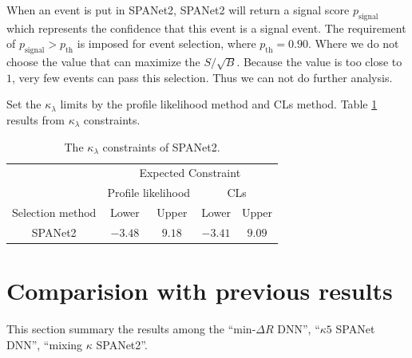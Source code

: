 \documentclass[12pt]{article}
\begin{document}
		When an event is put in SPANet2, SPANet2 will return a signal score $p_\text{signal}$ which represents the confidence that this event is a signal event. The requirement of $p_\text{signal} > p_\text{th}$ is imposed for event selection, where $p_\text{th} = 0.90$. Where we do not choose the value that can maximize the $S / \sqrt{B}$. Because the value is too close to $1$, very few events can pass this selection. Thus we can not do further analysis.  

		Set the $\kappa_\lambda$ limits by the profile likelihood method and CLs method. Table \ref{tab:kappa_constraint_SPANet} results from $\kappa_\lambda$ constraints.
		\begin{table}[htpb]
			\centering
			\caption{The $\kappa_\lambda$ constraints of SPANet2.}
			\label{tab:kappa_constraint_SPANet}
			\begin{tabular}{c|cc|cc}
								  & \multicolumn{4}{c}{Expected Constraint}                          \\
								  & \multicolumn{2}{c}{Profile likelihood} & \multicolumn{2}{c}{CLs} \\ \hline
			Selection method        & Lower              & Upper             & Lower      & Upper      \\ \hline
			SPANet2      & $-3.48$            & $9.18$             & $-3.41$      & $9.09$      \\
			\end{tabular}
		\end{table}

		
\section{Comparision with previous results}%
\label{sec:comparision_with_previous_results}
	This section summary the results among the ``$\text{min-}\Delta R$ DNN'', ``$\kappa 5$ SPANet DNN'', ``mixing $\kappa$ SPANet2''.
\end{document}
